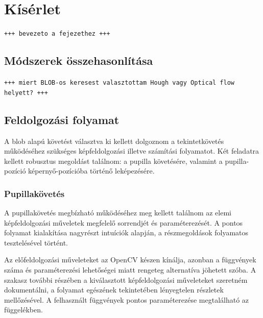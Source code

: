 \chapter{Kísérlet}\label{sect:kiserlet}

\texttt{+++ bevezeto a fejezethez +++}


\section{Módszerek összehasonlítása}\label{sect:modsz_osszehasonlitas}

\texttt{+++ miert BLOB-os keresest valasztottam Hough vagy Optical flow helyett? +++}

\section{Feldolgozási folyamat}\label{sect:feld_folyamat}

A blob alapú követést választva ki kellett dolgoznom a tekintetkövetés működéséhez szükséges képfeldolgozási illetve számítási folyamatot. Két feladatra kellett robusztus megoldást találnom: a pupilla követésére, valamint a pupilla-pozíció képernyő-pozícióba történő leképezésére.

\subsection{Pupillakövetés}\label{sect:pupillakov}

A pupillakövetés megbízható működéséhez meg kellett találnom az elemi képfeldolgozási műveletek megfelelő sorrendjét és paraméterezését. A pontos folyamat kialakítása nagyrészt intuíciók alapján, a részmegoldások folyamatos tesztelésével történt.

Az előfeldolgozási műveleteket az OpenCV készen kínálja, azonban a függvények száma és paraméterezési lehetőségei miatt rengeteg alternatíva jöhetett szóba. A szakasz további részében a kiválasztott képfeldolgozási műveleteket szeretném dokumentálni, a folyamat egészének tekintetében lényegtelen részletek mellőzésével. A felhasznált függvények pontos paraméterezése megtalálható az  függelékben.

